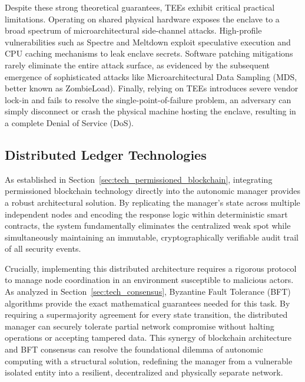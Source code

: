 Despite these strong theoretical guarantees, TEEs exhibit critical practical limitations. Operating on shared physical hardware exposes the enclave to a broad spectrum of microarchitectural side-channel attacks. High-profile vulnerabilities such as Spectre and Meltdown exploit speculative execution and CPU caching mechanisms to leak enclave secrets. Software patching mitigations rarely eliminate the entire attack surface, as evidenced by the subsequent emergence of sophisticated attacks like Microarchitectural Data Sampling (MDS, better known as ZombieLoad). Finally, relying on TEEs introduces severe vendor lock-in and fails to resolve the single-point-of-failure problem, an adversary can simply disconnect or crash the physical machine hosting the enclave, resulting in a complete Denial of Service (DoS).

\subsection{Distributed Ledger Technologies}
As established in Section~\ref{sec:tech_permissioned_blockchain}, integrating permissioned blockchain technology directly into the autonomic manager provides a robust architectural solution. By replicating the manager's state across multiple independent nodes and encoding the response logic within deterministic smart contracts, the system fundamentally eliminates the centralized weak spot while simultaneously maintaining an immutable, cryptographically verifiable audit trail of all security events.

Crucially, implementing this distributed architecture requires a rigorous protocol to manage node coordination in an environment susceptible to malicious actors. As analyzed in Section~\ref{sec:tech_consensus}, Byzantine Fault Tolerance (BFT) algorithms provide the exact mathematical guarantees needed for this task. By requiring a supermajority agreement for every state transition, the distributed manager can securely tolerate partial network compromise without halting operations or accepting tampered data. This synergy of blockchain architecture and BFT consensus can resolve the foundational dilemma of autonomic computing with a structural solution, redefining the manager from a vulnerable isolated entity into a resilient, decentralized and physically separate network.